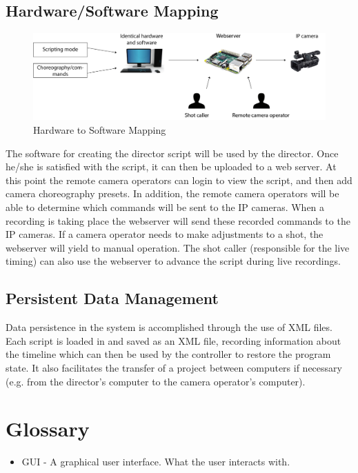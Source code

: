 \documentclass[11pt,twoside,a4paper]{article}
\begin{document}
\subsection{Hardware/Software Mapping}
\begin{figure}[H]
	\centering
	\includegraphics[width=\textwidth]{HWsoftwaremapping}
	\caption{Hardware to Software Mapping}
	\label{fig:mapping}
\end{figure}

The software for creating the director script will be used by the director. Once he/she is satisfied with the script, it can then be uploaded to a web server. At this point the remote camera operators can login to view the script, and then add camera choreography presets. In addition, the remote camera operators will be able to determine which commands will be sent to the IP cameras. When a recording is taking place the webserver will send these recorded commands to the IP cameras. If a camera operator needs to make adjustments to a shot, the webserver will yield to manual operation. The shot caller (responsible for the live timing) can also use the webserver to advance the script during live recordings.

\subsection{Persistent Data Management}
Data persistence in the system is accomplished through the use of XML files. Each script is loaded in and saved as an XML file, recording information about the timeline which can then be used by the controller to restore the program state. It also facilitates the transfer of a project between computers if necessary (e.g. from the director's computer to the camera operator's computer).

\section{Glossary}
\begin{itemize}
  \item GUI - A graphical user interface. What the user interacts with.
\end{itemize}
\end{document}
